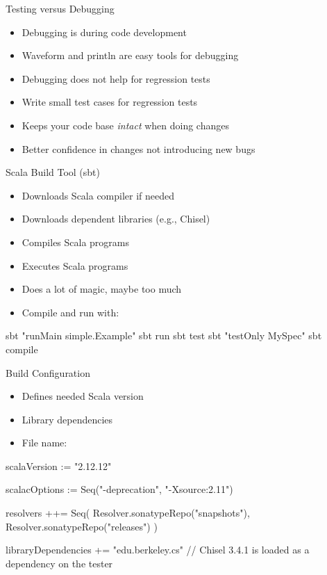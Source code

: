 \begin{frame}[fragile]{Testing versus Debugging}
\begin{itemize}
\item Debugging is during code development
\item Waveform and println are easy tools for debugging
\item Debugging does not help for regression tests
\item Write small test cases for regression tests
\item Keeps your code base \emph{intact} when doing changes
\item Better confidence in changes not introducing new bugs
\end{itemize}
\end{frame}

\begin{frame}[fragile]{Scala Build Tool (sbt)}
\begin{itemize}
\item Downloads Scala compiler if needed
\item Downloads dependent libraries (e.g., Chisel)
\item Compiles Scala programs
\item Executes Scala programs
\item Does a lot of magic, maybe too much
\item Compile and run with:
\end{itemize}
\begin{chisel}
sbt "runMain simple.Example"
sbt run
sbt test
sbt "testOnly MySpec"
sbt compile
\end{chisel}
\end{frame}

\begin{frame}[fragile]{Build Configuration}
\begin{itemize}
\item Defines needed Scala version
\item Library dependencies
\item File name: 
\end{itemize}
\begin{chisel}
scalaVersion := "2.12.12"

scalacOptions := Seq("-deprecation", "-Xsource:2.11")

resolvers ++= Seq(
  Resolver.sonatypeRepo("snapshots"),
  Resolver.sonatypeRepo("releases")
)

libraryDependencies += "edu.berkeley.cs" %
// Chisel 3.4.1 is loaded as a dependency on the tester
\end{chisel}
\end{frame}

